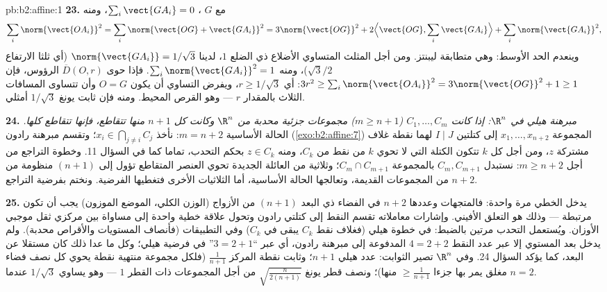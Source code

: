 \begin{solution}{pb:b2:affine:1}
\textbf{23.} مع $G$ ، $\sum_i\vect{GA_i} = 0$، ومنه
\[
\sum_i\norm{\vect{OA_i}}^2 = \sum_i\norm{\vect{OG} +
\vect{GA_i}}^2 = 3\norm{\vect{OG}}^2 + 2\Bigl\langle
\vect{OG}, \sum_i\vect{GA_i}\Bigr\rangle +
\sum_i\norm{\vect{GA_i}}^2,
\]
وينعدم الحد الأوسط: وهي متطابقة ليبنتز. ومن أجل المثلث المتساوي
الأضلاع ذي الضلع $1$، لدينا $\norm{\vect{GA_i}} =
1/\sqrt3$ (أي ثلثا الارتفاع $\sqrt3/2$)،
ومنه $\sum_i\norm{\vect{GA_i}}^2 = 1$. فإذا حوى $\overline D(O, r)$ الرؤوس، فإن $3r^2 \geq
\sum_i\norm{\vect{OA_i}}^2 = 3\norm{\vect{OG}}^2 + 1 \geq 1$: أي $r \geq 1/\sqrt3$، ويفرض
التساوي أن يكون $O = G$ وأن تتساوى المسافات الثلاث بالمقدار $r$
--- وهو القرص المحيط. ومنه فإن ثابت يونغ $1/\sqrt3$ أمثلي.

\textbf{24.} \emph{مبرهنة هيلي في $\R^n$: إذا كانت $C_1, \dots, C_m$ ($m \geq n + 1$)
مجموعات جزئية محدبة من $\R^n$ وكانت كل $n + 1$ منها تتقاطع، فإنها
تتقاطع كلها.} الحالة الأساسية $m = n +
2$: نأخذ $x_i \in \bigcap_{j\neq i}C_j$؛ وتقسم مبرهنة
رادون (\cref{exo:b2:affine:7}) المجموعة $x_1, \dots, x_{n+2}$ إلى كتلتين $I \mid J$ لهما نقطة غلاف
مشتركة $z$، ومن أجل كل $k$ تتكون الكتلة التي لا تحوي $k$
من نقط من $C_k$، ومنه $z \in C_k$ بحكم التحدب، تماما كما في السؤال 11.
وخطوة التراجع من أجل $m \geq n + 2$: نستبدل $C_m,
C_{m+1}$ بالمجموعة $C_m \cap C_{m+1}$؛
وثلاثية من العائلة الجديدة تحوي العنصر المتقاطع تؤول إلى $(n+1)$
منظومة من $n + 2$ من المجموعات القديمة، وتعالجها الحالة الأساسية،
أما الثلاثيات الأخرى فتغطيها الفرضية. ونختم بفرضية التراجع.

\textbf{25.} يدخل  الخطي مرة واحدة: فالمتجهات وعددها $n + 2$ في
الفضاء ذي البعد $(n+1)$ من الأزواج (الوزن الكلي، الموضع الموزون) يجب
أن تكون مرتبطة --- وذلك هو التعلق الأفيني. وإشارات معاملاته تقسم
النقط إلى كتلتي رادون وتحول علاقة خطية واحدة إلى مساواة بين مركزي
ثقل موجبي الأوزان. ويُستعمل التحدب مرتين بالضبط: في خطوة هيلي (فغلاف
نقط $C_k$ يبقى في $C_k$) وفي التطبيقات (فأنصاف المستويات والأقراص
محدبة). ولم يدخل بعد المستوي إلا عبر عدد النقط $4 = 2 + 2$ المدفوعة إلى
مبرهنة رادون، أي عبر ``$3 = 2 + 1$'' في فرضية هيلي؛ وكل ما عدا ذلك كان
مستقلا عن البعد، كما يؤكد السؤال 24. وفي $\R^n$ تصير الثوابت: عدد
هيلي $n + 1$؛ وثابت نقطة المركز $\frac1{n+1}$ (فلكل مجموعة منتهية نقطة
يحوي كل نصف فضاء مغلق يمر بها جزءا $\geq
\frac1{n+1}$ منها)؛ ونصف قطر يونغ
$\sqrt{\frac{n}{2(n+1)}}$ من أجل المجموعات ذات القطر $1$ --- وهو يساوي $1/\sqrt3$
عندما $n = 2$.
\end{solution}
